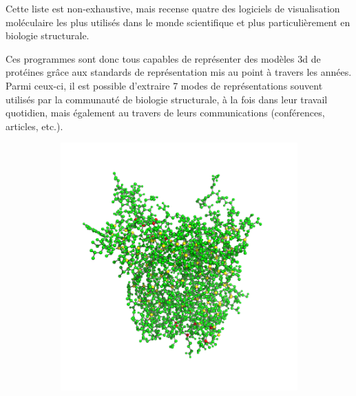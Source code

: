 Cette liste est non-exhaustive, mais recense quatre des logiciels de visualisation moléculaire les plus utilisés dans le monde scientifique et plus particulièrement en biologie structurale.

Ces programmes sont donc tous capables de représenter des modèles 3d de protéines grâce aux standards de représentation mis au point à travers les années. Parmi ceux-ci, il est possible d'extraire 7 modes de représentations souvent utilisés par la communauté de biologie structurale, à la fois dans leur travail quotidien, mais également au travers de leurs communications (conférences, articles, etc.).

\begin{figure}
  \begin{subfigure}{.5\textwidth}
  \centering
  {\includegraphics[width=\linewidth]{./figures/ch1/ball_sticks_representation}}
    \label{Fig:ball_sticks_representation}
  \caption{}
  \end{subfigure}%
  \begin{subfigure}{.5\textwidth}
  \centering

\end{subfigure}
\end{figure}
